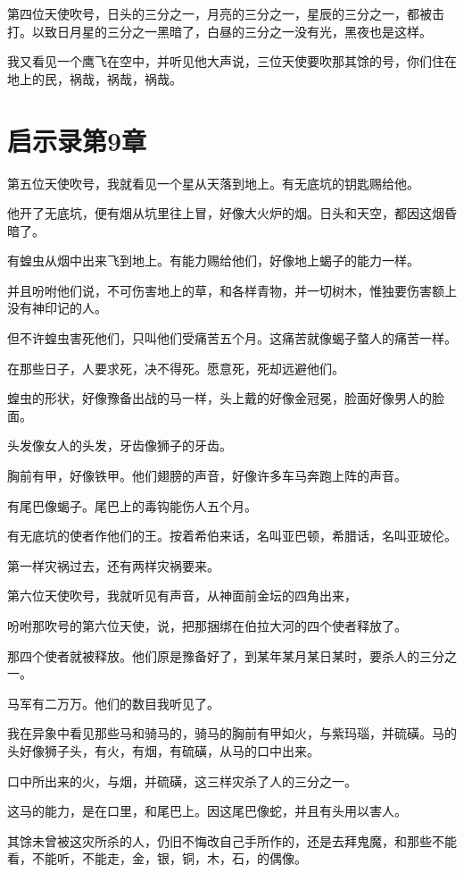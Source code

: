 \documentclass[12pt,oneside]{book}
\begin{document}
第四位天使吹号，日头的三分之一，月亮的三分之一，星辰的三分之一，都被击打。以致日月星的三分之一黑暗了，白昼的三分之一没有光，黑夜也是这样。

我又看见一个鹰飞在空中，并听见他大声说，三位天使要吹那其馀的号，你们住在地上的民，祸哉，祸哉，祸哉。

\chapter{启示录第9章}
第五位天使吹号，我就看见一个星从天落到地上。有无底坑的钥匙赐给他。

他开了无底坑，便有烟从坑里往上冒，好像大火炉的烟。日头和天空，都因这烟昏暗了。

有蝗虫从烟中出来飞到地上。有能力赐给他们，好像地上蝎子的能力一样。

并且吩咐他们说，不可伤害地上的草，和各样青物，并一切树木，惟独要伤害额上没有神印记的人。

但不许蝗虫害死他们，只叫他们受痛苦五个月。这痛苦就像蝎子螫人的痛苦一样。

在那些日子，人要求死，决不得死。愿意死，死却远避他们。

蝗虫的形状，好像豫备出战的马一样，头上戴的好像金冠冕，脸面好像男人的脸面。

头发像女人的头发，牙齿像狮子的牙齿。

胸前有甲，好像铁甲。他们翅膀的声音，好像许多车马奔跑上阵的声音。

有尾巴像蝎子。尾巴上的毒钩能伤人五个月。

有无底坑的使者作他们的王。按着希伯来话，名叫亚巴顿，希腊话，名叫亚玻伦。

第一样灾祸过去，还有两样灾祸要来。

第六位天使吹号，我就听见有声音，从神面前金坛的四角出来，

吩咐那吹号的第六位天使，说，把那捆绑在伯拉大河的四个使者释放了。

那四个使者就被释放。他们原是豫备好了，到某年某月某日某时，要杀人的三分之一。

马军有二万万。他们的数目我听见了。

我在异象中看见那些马和骑马的，骑马的胸前有甲如火，与紫玛瑙，并硫磺。马的头好像狮子头，有火，有烟，有硫磺，从马的口中出来。

口中所出来的火，与烟，并硫磺，这三样灾杀了人的三分之一。

这马的能力，是在口里，和尾巴上。因这尾巴像蛇，并且有头用以害人。

其馀未曾被这灾所杀的人，仍旧不悔改自己手所作的，还是去拜鬼魔，和那些不能看，不能听，不能走，金，银，铜，木，石，的偶像。
\end{document}

